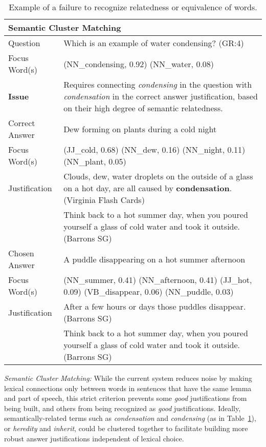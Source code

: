 \begin{table}[]
\caption{{  Example of a failure to recognize relatedness or equivalence of words. }} 
\begin{footnotesize}
\begin{tabularx}{\textwidth}{p{2.5cm}p{10cm}}
\hline
\multicolumn{2}{l}{Semantic Cluster Matching} \\
\hline
Question & Which is an example of water condensing? (GR:4)   \\
Focus Word(s) &  (NN\_condensing, 0.92) (NN\_water, 0.08) \\
\textbf{Issue}		& Requires connecting \emph{condensing} in the question with \emph{condensation} in the correct answer justification, based on their high degree of semantic relatedness. \\
\hline
Correct Answer &  Dew forming on plants during a cold night \\
Focus Word(s) &  (JJ\_cold, 0.68) (NN\_dew, 0.16) (NN\_night, 0.11) (NN\_plant, 0.05) \\
Justification 	& Clouds, dew, water droplets on the outside of a glass on a hot day, are all caused by {\bf condensation}. (Virginia Flash Cards) \\
 				& Think back to a hot summer day, when you poured yourself a glass of cold water and took it outside.  (Barrons SG) \\
\hline
Chosen Answer & A puddle disappearing on a hot summer afternoon \\
Focus Word(s) &  (NN\_summer, 0.41) (NN\_afternoon, 0.41) (JJ\_hot, 0.09) (VB\_disappear, 0.06) (NN\_puddle, 0.03) \\
Justification 	& After a few hours or days those puddles disappear. (Barrons SG) \\
			 	& Think back to a hot summer day, when you poured yourself a glass of cold water and took it outside.  (Barrons SG) \\
\hline
\end{tabularx}
\end{footnotesize}
\label{ex:clustermatching}

\end{table}


{}

{\flushleft \emph{Semantic Cluster Matching: }}
While the current system reduces noise by making lexical connections only between words in sentences that have the same lemma and part of speech, this strict criterion prevents some \emph{good} justifications from being built, and others from being recognized as \emph{good} justifications.  Ideally, semantically-related terms such as \emph{condensation} and \emph{condensing} (as in Table~\ref{ex:clustermatching}), or \emph{heredity} and \emph{inherit}, could be clustered together to facilitate building more robust answer justifications independent of lexical choice. 

